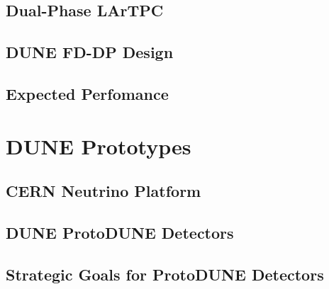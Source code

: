 
\subsection{Dual-Phase LArTPC}
\label{sec:exec-summ-fd-dp-tpc}


\subsection{DUNE FD-DP Design}
\label{sec:exec-summ-fd-dp-design}


\subsection{Expected Perfomance}
\label{sec:exec-summ-fd-dp-perf}



\section{DUNE Prototypes}
\label{sec:exec-summ-fd-proto}


\subsection{CERN Neutrino Platform }
\label{sec:exec-summ-fd-ehn1}


\subsection{DUNE ProtoDUNE Detectors}
\label{sec:exec-summ-fd-pdune}


\subsection{Strategic Goals for ProtoDUNE Detectors}
\label{sec:exec-summ-fd-pdune-goals}


